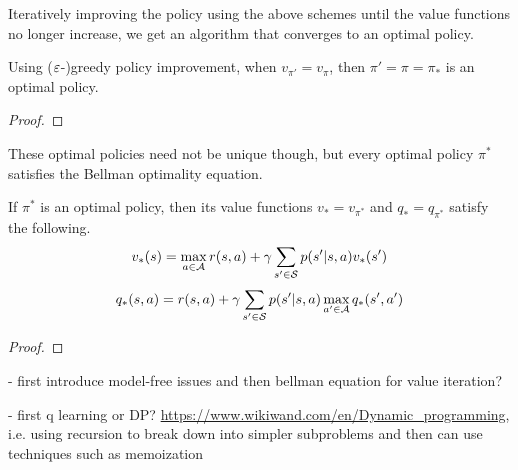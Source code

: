 Iteratively improving the policy using the above schemes until the value functions no longer increase, we get an algorithm that converges to an optimal policy. \todo[more?]

\begin{proposition}
    Using ($\varepsilon$-)greedy policy improvement, when $v_{\pi'} = v_\pi$, then $\pi' = \pi = \pi_*$ is an optimal policy.
\end{proposition}
\begin{proof}
    \todo
\end{proof}


These optimal policies need not be unique though, but every optimal policy $\pi^*$ satisfies the Bellman optimality equation. 

\begin{proposition}
    If $\pi^*$ is an optimal policy, then its value functions $v_* = v_{\pi^*}$ and $q_* = q_{\pi^*}$ satisfy the following.
    $$v_*(s) = \max_{a \in \mathcal{A}} r(s,a) + \gamma \sum_{s' \in \mathcal{S}} p(s'|s,a) v_*(s')$$
    $$q_*(s, a) = r(s,a) + \gamma \sum_{s' \in \mathcal{S}} p(s' | s, a) \max_{a' \in \mathcal{A}} q_*(s', a')$$
\end{proposition}
\begin{proof}
    \todo
\end{proof}

\begin{notes}
    - first introduce model-free issues and then bellman equation for value iteration?

    - first q learning or DP? \url{https://www.wikiwand.com/en/Dynamic_programming}, i.e. using recursion to break down into simpler subproblems and then can use techniques such as memoization

\end{notes}

